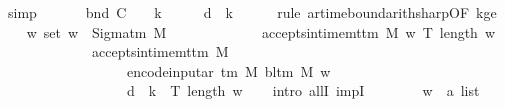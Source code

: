 \begin{isabellebody}
\ simp\isanewline
\ \ \isamarkupfalse%
\isanewline
\ \ \isamarkupfalse%
\ bnd{\isacharcolon}{\kern0pt}\ {\isachardoublequoteopen}{\isacharquery}{\kern0pt}C\ {\isacharasterisk}{\kern0pt}\ {\isacharparenleft}{\kern0pt}{}\ {\isacharasterisk}{\kern0pt}\ {\isacharquery}{\kern0pt}k\ {\isacharplus}{\kern0pt}\ {}{\isacharparenright}{\kern0pt}\ {\isacharplus}{\kern0pt}\ {}\ {\isasymle}\ {\isacharquery}{\kern0pt}d\ {\isacharasterisk}{\kern0pt}\ {\isacharquery}{\kern0pt}k{\isachardoublequoteclose}\isanewline
\ \ \ \ \isamarkupfalse%
\ {\isacharparenleft}{\kern0pt}rule\ ar{\isacharunderscore}{\kern0pt}time{\isacharunderscore}{\kern0pt}bound{\isacharunderscore}{\kern0pt}arith{\isacharunderscore}{\kern0pt}sharp{\isacharbrackleft}{\kern0pt}OF\ kge{}{\isacharbrackright}{\kern0pt}{\isacharparenright}{\kern0pt}\isanewline
\ \ \isamarkupfalse%
\ {\isachardoublequoteopen}{\isasymforall}w{\isachardot}{\kern0pt}\ set\ w\ {\isasymsubseteq}\ Sigma{\isacharunderscore}{\kern0pt}tm\ M\isanewline
\ \ \ \ \ \ \ \ \ \ \ \ {\isasymlongrightarrow}\ accepts{\isacharunderscore}{\kern0pt}in{\isacharunderscore}{\kern0pt}time{\isacharunderscore}{\kern0pt}mttm\ M\ w\ {\isacharparenleft}{\kern0pt}T\ {\isacharparenleft}{\kern0pt}length\ w{\isacharparenright}{\kern0pt}{\isacharparenright}{\kern0pt}\isanewline
\ \ \ \ \ \ \ \ \ \ \ \ {\isasymlongrightarrow}\ accepts{\isacharunderscore}{\kern0pt}in{\isacharunderscore}{\kern0pt}time{\isacharunderscore}{\kern0pt}mttm\ {\isacharquery}{\kern0pt}M{\isacharprime}{\kern0pt}\isanewline
\ \ \ \ \ \ \ \ \ \ \ \ \ \ \ \ \ \ {\isacharparenleft}{\kern0pt}encode{\isacharunderscore}{\kern0pt}input{\isacharunderscore}{\kern0pt}ar\ {\isacharparenleft}{\kern0pt}{\isasymGamma}{\isacharunderscore}{\kern0pt}tm\ M{\isacharparenright}{\kern0pt}\ {\isacharparenleft}{\kern0pt}bl{\isacharunderscore}{\kern0pt}tm\ M{\isacharparenright}{\kern0pt}\ w{\isacharparenright}{\kern0pt}\isanewline
\ \ \ \ \ \ \ \ \ \ \ \ \ \ \ \ \ \ {\isacharparenleft}{\kern0pt}{\isacharquery}{\kern0pt}d\ {\isacharasterisk}{\kern0pt}\ {\isacharquery}{\kern0pt}k\ {\isacharasterisk}{\kern0pt}\ T\ {\isacharparenleft}{\kern0pt}length\ w{\isacharparenright}{\kern0pt}{\isacharparenright}{\kern0pt}{\isachardoublequoteclose}\isanewline
\ \ \isamarkupfalse%
\ {\isacharparenleft}{\kern0pt}intro\ allI\ impI{\isacharparenright}{\kern0pt}\isanewline
\ \ \ \ \ \ \isamarkupfalse%
\ w\ {\isacharcolon}{\kern0pt}{\isacharcolon}{\kern0pt}\ {\isachardoublequoteopen}{\isacharprime}{\kern0pt}a\ list{\isachardoublequoteclose}\isanewline

\end{isabellebody}
